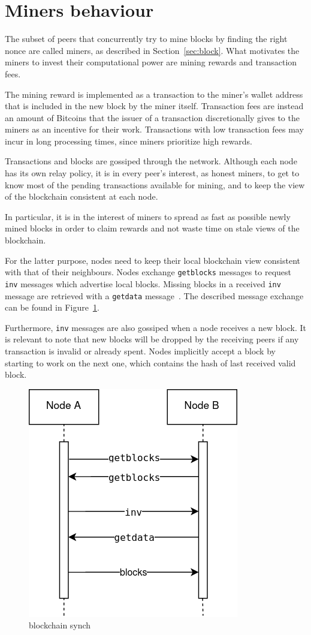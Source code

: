 \section{Miners behaviour}\label{sec:miners}
The subset of peers that concurrently try to mine blocks by finding the right nonce are called miners, as described in Section~\ref{sec:block}. What motivates the miners to invest their computational power are mining rewards and transaction fees.

The mining reward is implemented as a transaction to the miner's wallet address that is included in the new block by the miner itself. Transaction fees are instead an amount of Bitcoins that the issuer of a transaction discretionally gives to the miners as an incentive for their work. Transactions with low transaction fees may incur in long processing times, since miners prioritize high rewards.\par

Transactions and blocks are gossiped through the network. Although each node has its own relay policy, it is in every peer's interest, as honest miners, to get to know most of the pending transactions available for mining, and to keep the view of the blockchain consistent at each node.

In particular, it is in the interest of miners to spread as fast as possible newly mined blocks in order to claim rewards and not waste time on stale views of the blockchain.

For the latter purpose, nodes need to keep their local blockchain view consistent with that of their neighbours. Nodes exchange \texttt{getblocks} messages to request \texttt{inv} messages which advertise local blocks. Missing blocks in a received \texttt{inv} message are retrieved with a \texttt{getdata} message~\cite{protocoldoc}. The described message exchange can be found in Figure~\ref{fig:synch}.

Furthermore, \texttt{inv} messages are also gossiped when a node receives a new block. It is relevant to note that new blocks will be dropped by the receiving peers if any transaction is invalid or already spent. Nodes implicitly accept a block by starting to work on the next one, which contains the hash of last received valid block. 

\begin{figure}[h]
	\includegraphics[width=.35\textwidth]{pict/blockchain-synch.png}
	\centering
	\caption{blockchain synch}
	\label{fig:synch}
\end{figure}

